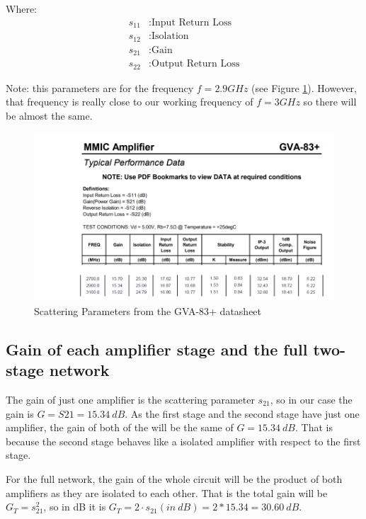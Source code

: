 \documentclass[12pt]{report} %
\begin{document}
Where:
\begin{align*}
s_{11} & : \text{Input Return Loss} \\
s_{12} & : \text{Isolation} \\
s_{21} & : \text{Gain} \\
s_{22} & : \text{Output Return Loss}
\end{align*}

Note: this parameters are for the frequency $f = 2.9 GHz$ (see Figure \ref{fig:design_circuit_elements:scattering_parameters_datasheet}). However, that frequency is really close to our working frequency of $f = 3 GHz$ so there will be almost the same.

\begin{figure}[htbp]
    \centering
    \includegraphics[width=\textwidth]{images/design_circuit_elements/scattering_parameters_datasheet.png}
    \caption{Scattering Parameters from the GVA-83+ datasheet}
    \label{fig:design_circuit_elements:scattering_parameters_datasheet}
\end{figure}

\subsection{Gain of each amplifier stage and the full two-stage network}
\label{subsec:gain_each_amplifier_and_full_two_stage}

The gain of just one amplifier is the scattering parameter $s_{21}$, so in our case the gain is $G = S{21} = 15.34 \ dB$. As the first stage and the second stage have just one amplifier, the gain of both of the will be the same of $G = 15.34 \ dB$. That is because the second stage behaves like a isolated amplifier with respect to the first stage.

For the full network, the gain of the whole circuit will be the product of both amplifiers as they are isolated to each other. That is the total gain will be $G_T = s_{21}^2$, so in dB it is $G_T = 2 \cdot s_{21} (in \ dB) = 2 * 15.34 = 30.60 \ dB$.
\end{document}
